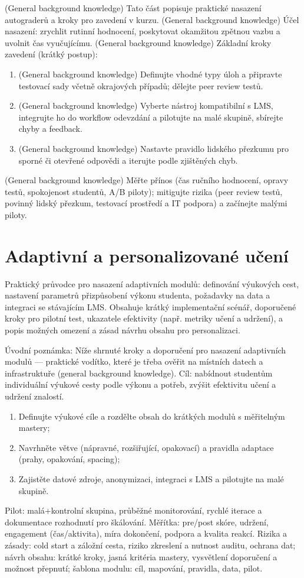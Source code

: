 \documentclass{report}%
\begin{document}
%
(General background knowledge) Tato část popisuje praktické nasazení autograderů a kroky pro zavedení v kurzu.
(General background knowledge) Účel nasazení: zrychlit rutinní hodnocení, poskytovat okamžitou zpětnou vazbu a uvolnit čas vyučujícímu.
(General background knowledge) Základní kroky zavedení (krátký postup):
\begin{enumerate}
\item (General background knowledge) Definujte vhodné typy úloh a připravte testovací sady včetně okrajových případů; dělejte peer review testů.
\item (General background knowledge) Vyberte nástroj kompatibilní s LMS, integrujte ho do workflow odevzdání a pilotujte na malé skupině, sbírejte chyby a feedback.
\item (General background knowledge) Nastavte pravidlo lidského přezkumu pro sporné či otevřené odpovědi a iterujte podle zjištěných chyb.
\end{enumerate}
(General background knowledge) Měřte přínos (čas ručního hodnocení, opravy testů, spokojenost studentů, A/B piloty); mitigujte rizika (peer review testů, povinný lidský přezkum, testovací prostředí a IT podpora) a začínejte malými piloty.%

%
\section{Adaptivní a personalizované učení}%
Praktický průvodce pro nasazení adaptivních modulů: definování výukových cest, nastavení parametrů přizpůsobení výkonu studenta, požadavky na data a integraci se stávajícím LMS. Obsahuje krátký implementační scénář, doporučené kroky pro pilotní test, ukazatele efektivity (např. metriky učení a udržení), a popis možných omezení a zásad návrhu obsahu pro personalizaci.%


%
Úvodní poznámka: Níže shrnuté kroky a doporučení pro nasazení adaptivních modulů — praktické vodítko, které je třeba ověřit na místních datech a infrastruktuře (general background knowledge).
Cíl: nabídnout studentům individuální výukové cesty podle výkonu a potřeb, zvýšit efektivitu učení a udržení znalostí.
\begin{enumerate}
\item Definujte výukové cíle a rozdělte obsah do krátkých modulů s měřitelným mastery; \item Navrhněte větve (nápravné, rozšiřující, opakovací) a pravidla adaptace (prahy, opakování, spacing); \item Zajistěte datové zdroje, anonymizaci, integraci s LMS a pilotujte na malé skupině.
\end{enumerate}
Pilot: malá+kontrolní skupina, průběžné monitorování, rychlé iterace a dokumentace rozhodnutí pro škálování.
Měřítka: pre/post skóre, udržení, engagement (čas/aktivita), míra dokončení, podpora a kvalita reakcí.
Rizika a zásady: cold start a záložní cesta, riziko zkreslení a nutnost auditu, ochrana dat; návrh obsahu: krátké kroky, jasná kritéria mastery, vysvětlení doporučení a možnost přepnutí; šablona modulu: cíl, mapování, pravidla, data, pilot.%
\end{document}
